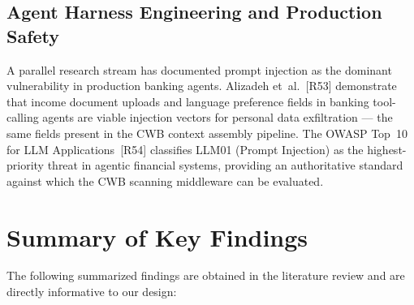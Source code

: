 \documentclass[12pt,a4paper]{report}
\begin{document}
\subsection{Agent Harness Engineering and Production Safety}
\label{sec:harness-lit}

A parallel research stream has documented prompt injection as the dominant
vulnerability in production banking agents. Alizadeh et~al.~[R53]
demonstrate that income document uploads and language preference fields in
banking tool-calling agents are viable injection vectors for personal data
exfiltration --- the same fields present in the CWB context assembly pipeline.
The OWASP Top~10 for LLM Applications~[R54] classifies LLM01 (Prompt
Injection) as the highest-priority threat in agentic financial systems, providing
an authoritative standard against which the CWB scanning middleware can be
evaluated.

\section{Summary of Key Findings}

The following summarized findings are obtained in the literature review and are directly informative to our design:
\end{document}

